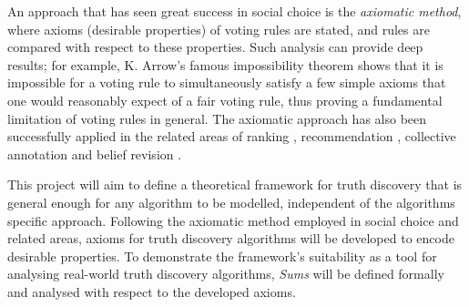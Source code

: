 \documentclass[../main.tex]{subfiles}
\begin{document}
An approach that has seen great success in social choice is the \emph{axiomatic
method}, where axioms (desirable properties) of voting rules are stated, and
rules are compared with respect to these properties. Such analysis can provide
deep results; for example, K. Arrow's famous impossibility theorem \cite{arrow}
shows that it is impossible for a voting rule to simultaneously satisfy a few
simple axioms that one would reasonably expect of a fair voting rule, thus
proving a fundamental limitation of voting rules in general. The axiomatic
approach has also been successfully applied in the related areas of ranking
\cite{altman_foundations, altman_personalised}, recommendation \cite{andersen,
lev}, collective annotation \cite{kruger} and belief revision \cite{agm}.

This project will aim to define a theoretical framework for truth discovery
that is general enough for any algorithm to be modelled, independent of the
algorithms specific approach. Following the axiomatic method employed in social
choice and related areas, axioms for truth discovery algorithms will be
developed to encode desirable properties. To demonstrate the framework's
suitability as a tool for analysing real-world truth discovery algorithms,
\emph{Sums} \cite{pasternack} will be defined formally and analysed with
respect to the developed axioms.
\end{document}
